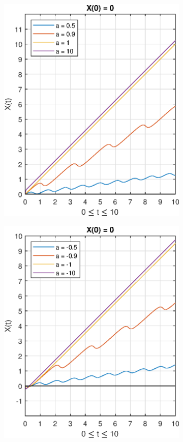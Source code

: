 \documentclass[11pt]{article} %
\begin{document}
\begin{figure}[h]
	\centering
	\begin{subfigure}{0.5\textwidth}
	\centering
		\includegraphics[width=\textwidth]{"../Matlab Files/x0=0 apos high"}
	\end{subfigure}%
	\begin{subfigure}{0.5\textwidth}
	\centering
		\includegraphics[width=\textwidth]{"../Matlab Files/x0=0 aneg high"}

\end{subfigure}
\end{figure}
\end{document}
